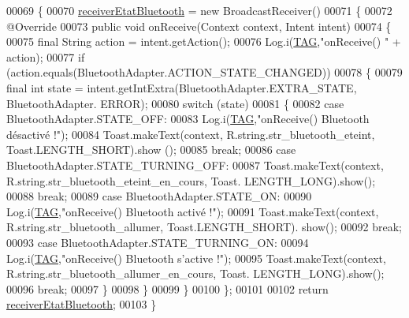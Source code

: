 \begin{DoxyCode}
00069     \{
00070         \hyperlink{classcom_1_1lasalle_1_1io__trucks_1_1_communication_a4a45e2d6f9b84afa60b4a28b52f5a4bf}{receiverEtatBluetooth} = \textcolor{keyword}{new} BroadcastReceiver()
00071         \{
00072             @Override
00073             \textcolor{keyword}{public} \textcolor{keywordtype}{void} onReceive(Context context, Intent intent)
00074             \{
00075                 \textcolor{keyword}{final} String action = intent.getAction();
00076                 Log.i(\hyperlink{classcom_1_1lasalle_1_1io__trucks_1_1_communication_aec1062036f071d51a4925a3080d71004}{TAG},\textcolor{stringliteral}{"onReceive() "} + action);
00077                 \textcolor{keywordflow}{if} (action.equals(BluetoothAdapter.ACTION\_STATE\_CHANGED))
00078                 \{
00079                     \textcolor{keyword}{final} \textcolor{keywordtype}{int} state = intent.getIntExtra(BluetoothAdapter.EXTRA\_STATE, BluetoothAdapter.
      ERROR);
00080                     \textcolor{keywordflow}{switch} (state)
00081                     \{
00082                         \textcolor{keywordflow}{case} BluetoothAdapter.STATE\_OFF:
00083                             Log.i(\hyperlink{classcom_1_1lasalle_1_1io__trucks_1_1_communication_aec1062036f071d51a4925a3080d71004}{TAG},\textcolor{stringliteral}{"onReceive() Bluetooth désactivé !"});
00084                             Toast.makeText(context, R.string.str\_bluetooth\_eteint, Toast.LENGTH\_SHORT).show
      ();
00085                             \textcolor{keywordflow}{break};
00086                         \textcolor{keywordflow}{case} BluetoothAdapter.STATE\_TURNING\_OFF:
00087                             Toast.makeText(context, R.string.str\_bluetooth\_eteint\_en\_cours, Toast.
      LENGTH\_LONG).show();
00088                             \textcolor{keywordflow}{break};
00089                         \textcolor{keywordflow}{case} BluetoothAdapter.STATE\_ON:
00090                             Log.i(\hyperlink{classcom_1_1lasalle_1_1io__trucks_1_1_communication_aec1062036f071d51a4925a3080d71004}{TAG},\textcolor{stringliteral}{"onReceive() Bluetooth activé !"});
00091                             Toast.makeText(context, R.string.str\_bluetooth\_allumer, Toast.LENGTH\_SHORT).
      show();
00092                             \textcolor{keywordflow}{break};
00093                         \textcolor{keywordflow}{case} BluetoothAdapter.STATE\_TURNING\_ON:
00094                             Log.i(\hyperlink{classcom_1_1lasalle_1_1io__trucks_1_1_communication_aec1062036f071d51a4925a3080d71004}{TAG},\textcolor{stringliteral}{"onReceive() Bluetooth s'active !"});
00095                             Toast.makeText(context, R.string.str\_bluetooth\_allumer\_en\_cours, Toast.
      LENGTH\_LONG).show();
00096                             \textcolor{keywordflow}{break};
00097                     \}
00098                 \}
00099             \}
00100         \};
00101 
00102         \textcolor{keywordflow}{return} \hyperlink{classcom_1_1lasalle_1_1io__trucks_1_1_communication_a4a45e2d6f9b84afa60b4a28b52f5a4bf}{receiverEtatBluetooth};
00103     \}
\end{DoxyCode}
